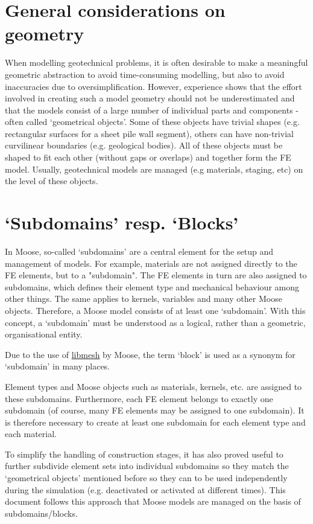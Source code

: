 \section{General considerations on geometry}
\label{geometry-general}

When modelling geotechnical problems, it is often desirable to make a
meaningful geometric abstraction to avoid time-consuming modelling, but also to
avoid inaccuracies due to oversimplification. However, experience shows that
the effort involved in creating such a model geometry should not be
underestimated and that the models consist of a large number of individual
parts and components - often called ‘geometrical objects’. Some of these
objects have trivial shapes (e.g. rectangular surfaces for a sheet pile wall
segment), others can have non-trivial curvilinear boundaries (e.g. geological
bodies). All of these objects must be shaped to fit each other (without gaps or
overlaps) and together form the FE model. Usually, geotechnical models are
managed (e.g materials, staging, etc) on the level of these objects.

\section{‘Subdomains’ resp. ‘Blocks’}
\label{geometry-blocks-and-subdomains}

In Moose, so-called ‘subdomains’ are a central element for the setup and
management of models. For example, materials are not assigned directly to
the FE elements, but to a "subdomain". The FE elements in turn are also
assigned to subdomains, which defines their element type and mechanical
behaviour among other things. The same applies to kernels, variables and
many other Moose objects. Therefore, a Moose model consists of at least one
‘subdomain’. With this concept, a ‘subdomain’ must be understood as a logical,
rather than a geometric, organisational entity.

Due to the use of \href{https://libmesh.github.io/}{libmesh} by Moose, the term
‘block’ is used as a synonym for ‘subdomain’ in many places.

Element types and Moose objects such as materials, kernels, etc. are assigned
to these subdomains. Furthermore, each FE element belongs to exactly one
subdomain (of course, many FE elements may be assigned to one subdomain). It
is therefore necessary to create at least one subdomain for each element type
and each material.

To simplify the handling of construction stages, it has also proved useful to
further subdivide element sets into individual subdomains so they match the
‘geometrical objects’ mentioned before so they can to be used independently
during the simulation (e.g. deactivated or activated at different times).
This document follows this approach that Moose models are managed on the
basis of subdomains/blocks.

